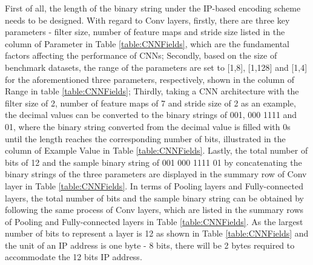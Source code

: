 \documentclass[conference]{IEEEtran}
\begin{document}
First of all, the length of the binary string under the IP-based encoding scheme needs to be designed. With regard to Conv layers, firstly, there are three key parameters - filter size, number of feature maps and stride size listed in the column of Parameter in Table \ref{table:CNNFields}, which are the fundamental factors affecting the performance of CNNs; Secondly, based on the size of benchmark datasets, the range of the parameters are set to [1,8], [1,128] and [1,4] for the aforementioned three parameters, respectively, shown in the column of Range in table \ref{table:CNNFields}; Thirdly, taking a CNN architecture with the filter size of 2, number of feature maps of 7 and stride size of 2 as an example, the decimal values can be converted to the binary strings of 001, 000 1111 and 01, where the binary string converted from the decimal value is filled with 0s until the length reaches the corresponding number of bits, illustrated in the column of Example Value in Table \ref{table:CNNFields}. Lastly, the total number of bits of 12 and the sample binary string of 001 000 1111 01 by concatenating the binary strings of the three parameters are displayed in the summary row of Conv layer in Table \ref{table:CNNFields}. In terms of Pooling layers and Fully-connected layers, the total number of bits and the sample binary string can be obtained by following the same process of Conv layers, which are listed in the summary rows of Pooling and Fully-connected layers in Table \ref{table:CNNFields}.  As the largest number of bits to represent a layer is 12 as shown in Table \ref{table:CNNFields} and the unit of an IP address is one byte - 8 bits, there will be 2 bytes required to accommodate the 12 bits IP address.
\end{document}
